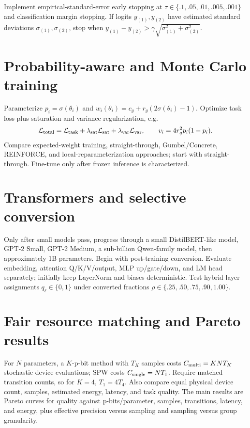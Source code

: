 \documentclass[11pt]{article}
\begin{document}
Implement empirical-standard-error early stopping at
$\tau\in\{.1,.05,.01,.005,.001\}$ and classification margin stopping. If logits
$y_{(1)},y_{(2)}$ have estimated standard deviations $\sigma_{(1)},\sigma_{(2)}$,
stop when $y_{(1)}-y_{(2)}>\gamma\sqrt{\sigma_{(1)}^2+\sigma_{(2)}^2}$.

\section{Probability-aware and Monte Carlo training}
Parameterize $p_i=\sigma(\theta_i)$ and
$w_i(\theta_i)=c_g+r_g(2\sigma(\theta_i)-1)$. Optimize task loss plus saturation
and variance regularization, e.g.
\begin{equation}
 \mathcal L_{\rm total}=\mathcal L_{\rm task}+\lambda_{\rm sat}\mathcal L_{\rm sat}
 +\lambda_{\rm var}\mathcal L_{\rm var},\qquad
 v_i=4r_g^2p_i(1-p_i).
\end{equation}
Compare expected-weight training, straight-through, Gumbel/Concrete, REINFORCE, and
local-reparameterization approaches; start with straight-through. Fine-tune only after
frozen inference is characterized.

\section{Transformers and selective conversion}
Only after small models pass, progress through a small DistilBERT-like model, GPT-2 Small,
GPT-2 Medium, a sub-billion Qwen-family model, then approximately 1B parameters. Begin
with post-training conversion. Evaluate embedding, attention Q/K/V/output, MLP up/gate/down,
and LM head separately; initially keep LayerNorm and biases deterministic.
Test hybrid layer assignments $q_\ell\in\{0,1\}$ under converted fractions
$\rho\in\{.25,.50,.75,.90,1.00\}$.

\section{Fair resource matching and Pareto results}
For $N$ parameters, a $K$-p-bit method with $T_K$ samples costs
$C_{\rm multi}=KNT_K$ stochastic-device evaluations; SPW costs $C_{\rm single}=NT_1$.
Require matched transition counts, so for $K=4$, $T_1=4T_4$. Also compare equal
physical device count, samples, estimated energy, latency, and task quality. The main
results are Pareto curves for quality against p-bits/parameter, samples, transitions,
latency, and energy, plus effective precision versus sampling and sampling versus group
granularity.
\end{document}
